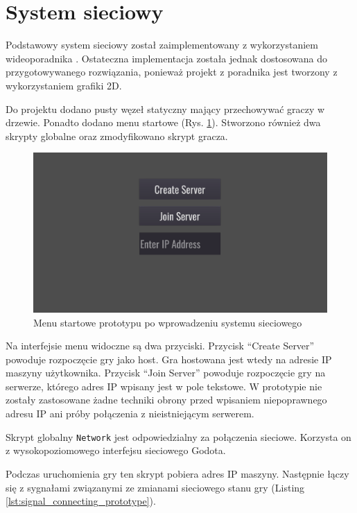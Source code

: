 \section{System sieciowy}\label{sec:network_prototype}

Podstawowy system sieciowy został zaimplementowany z wykorzystaniem wideoporadnika \cite{godot_network_tutorial}. Ostateczna implementacja została jednak dostosowana do przygotowywanego rozwiązania, ponieważ projekt z poradnika jest tworzony z wykorzystaniem grafiki 2D.

Do projektu dodano pusty węzeł statyczny mający przechowywać graczy w drzewie. Ponadto dodano menu startowe (Rys. \ref{fig:prototype_menu}). Stworzono również dwa skrypty globalne oraz zmodyfikowano skrypt gracza.

\begin{figure}
    \centering
    \includegraphics[width=.9\linewidth]{Images/prototype/prototype_net_menu.png}
    \caption{Menu startowe prototypu po wprowadzeniu systemu sieciowego}
    \label{fig:prototype_menu}
\end{figure}

Na interfejsie menu widoczne są dwa przyciski. Przycisk ``Create Server'' powoduje rozpoczęcie gry jako host. Gra hostowana jest wtedy na adresie IP maszyny użytkownika. Przycisk ``Join Server'' powoduje rozpoczęcie gry na serwerze, którego adres IP wpisany jest w pole tekstowe. W prototypie nie zostały zastosowane żadne techniki obrony przed wpisaniem niepoprawnego adresu IP ani próby połączenia z nieistniejącym serwerem.

Skrypt globalny \texttt{Network} jest odpowiedzialny za połączenia sieciowe. Korzysta on z wysokopoziomowego interfejsu sieciowego Godota. 

Podczas uruchomienia gry ten skrypt pobiera adres IP maszyny. Następnie łączy się z sygnałami związanymi ze zmianami sieciowego stanu gry (Listing \ref{lst:signal_connecting_prototype}). 


